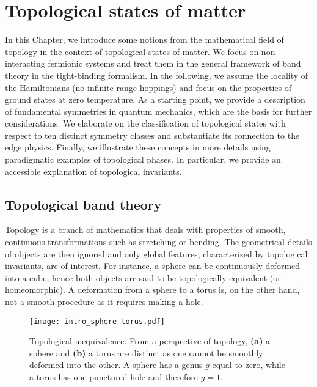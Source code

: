 \chapter{Topological states of matter}
\label{ch:topo-intro}
In this Chapter, we introduce some notions from the mathematical field of topology in the context of topological states of matter. We focus on non-interacting fermionic systems and treat them in the general framework of band theory in the tight-binding formalism. In the following, we assume the locality of the Hamiltonians (\ie no infinite-range hoppings) and focus on the properties of ground states at zero temperature. As a starting point, we provide a description of fundamental symmetries in quantum mechanics, which are the basis for further considerations. We elaborate on the classification of topological states with respect to ten distinct symmetry classes and substantiate its connection to the edge physics. Finally, we illustrate these concepts in more details using paradigmatic examples of topological phases. In particular, we provide an accessible explanation of topological invariants.

\section{Topological band theory}
Topology is a branch of mathematics that deals with properties of smooth, continuous transformations such as stretching or bending. The geometrical details of objects are then ignored and only global features, characterized by topological invariants, are of interest. For instance, a sphere can be continuously deformed into a cube, hence both objects are said to be topologically equivalent (or homeomorphic). A deformation from a sphere to a torus is, on the other hand, not a smooth procedure as it requires making a hole. 

\begin{figure}
\centering
\texttt{[image: intro\_sphere-torus.pdf]}
\caption[Topological inequivalence]{Topological inequivalence. From a perspective of topology, \textbf{(a)} a sphere and \textbf{(b)} a torus are distinct as one cannot be smoothly deformed into the other. A sphere has a genus $g$ equal to zero, while a torus has one punctured hole and therefore $g = 1$.}
\label{fig:topo_equiv}
\end{figure}

